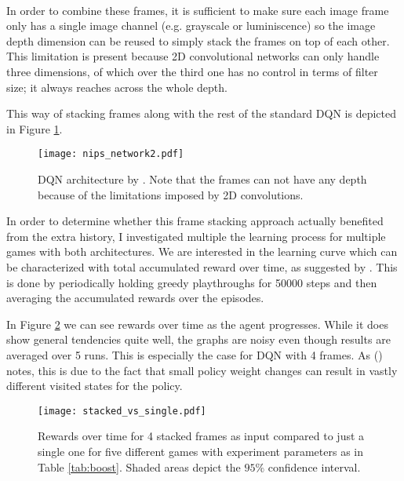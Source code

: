 \paragraph{}
In order to combine these frames,
it is sufficient to make sure each image frame only has a single image channel
(e.g. grayscale or luminiscence)
so the image depth dimension can be reused
to simply stack the frames on top of each other.
This limitation is present because 2D convolutional networks
can only handle three dimensions,
of which over the third one has no control in terms of filter size;
it always reaches across the whole depth.

This way of stacking frames along with the rest of the standard DQN
is depicted in Figure \ref{fig:nips_network2}.

\begin{figure}[htpb]
  \centering
  \texttt{[image: nips\_network2.pdf]}
  \caption[DQN architecture]{
    DQN architecture by \cite{Mnih2013}.
    Note that the frames can not have any depth because of
    the limitations imposed by 2D convolutions.
  }
  \label{fig:nips_network2}
\end{figure}

In order to determine
whether this frame stacking approach
actually benefited from the extra history,
I investigated multiple
the learning process for multiple games
with both architectures.
We are interested in the learning curve
which can be characterized with
total accumulated reward over time,
as suggested by \citeauthor{Bellemare2013} \citeyear{Bellemare2013}.
This is done by periodically
holding greedy playthroughs for 50000 steps
and then averaging the accumulated rewards
over the episodes.

In Figure \ref{fig:stacked_vs_single_rewards}
we can see rewards over time as the agent progresses.
While it does show general tendencies quite well,
the graphs are noisy even though results are averaged over 5 runs.
This is especially the case for DQN with 4 frames.
As \citeauthor{Mnih2013} (\citeyear{Mnih2013}) notes,
this is due to the fact that small policy weight changes
can result in vastly different visited states for the policy.

\begin{figure}[htpb]
  \centering
  \texttt{[image: stacked\_vs\_single.pdf]}
  \caption[DQN reward over time]{
    Rewards over time for 4 stacked frames as input
    compared to just a single one
    for five different games
    with experiment parameters as in Table \ref{tab:boost}.
    Shaded areas depict the $95\%$ confidence interval.
  }
  \label{fig:stacked_vs_single_rewards}
\end{figure}

